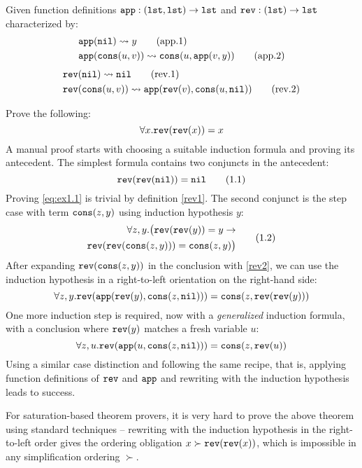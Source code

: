 \begin{example}\label{ex:1}
Given function definitions $\mathtt{app} : (\mathtt{lst},\mathtt{lst})\rightarrow\mathtt{lst}$ and $\mathtt{rev}:(\mathtt{lst})\rightarrow\mathtt{lst}$ characterized by:
\begin{align}
&\mathtt{app}(\mathtt{nil})\rightsquigarrow y\label{app1}\tag{app.1}\\ &\mathtt{app}(\mathtt{cons}(u,v))\rightsquigarrow\mathtt{cons}(u,\mathtt{app}(v,y))\label{app2}\tag{app.2}\end{align}
\dotfill
\begin{align}
&\mathtt{rev}(\mathtt{nil})\rightsquigarrow \mathtt{nil}\label{rev1}\tag{rev.1}\\ &\mathtt{rev}(\mathtt{cons}(u,v))\rightsquigarrow\mathtt{app}(\mathtt{rev}(v),\mathtt{cons}(u,\mathtt{nil}))\label{rev2}\tag{rev.2}\end{align}

Prove the following:
$$\forall x. \mathtt{rev}(\mathtt{rev}(x))=x$$
A manual proof starts with choosing a suitable induction formula and proving its antecedent. The simplest formula contains two conjuncts in the antecedent:
\begin{equation}\label{eq:ex1.1}\mathtt{rev}(\mathtt{rev}(\mathtt{nil})) = \mathtt{nil}\tag{1.1}\end{equation}
Proving \eqref{eq:ex1.1} is trivial by definition \eqref{rev1}. The second conjunct is the step case with term $\mathtt{cons}(z,y)$ using induction hypothesis $y$:
\begin{align}\begin{split}\forall z,y.\big(\mathtt{rev}(\mathtt{rev}(y))=y\rightarrow\\\mathtt{rev}(\mathtt{rev}(\mathtt{cons}(z,y)))=\mathtt{cons}(z,y)\big)\end{split}\label{eq:ex1.2}\tag{1.2}\end{align}
After expanding $\mathtt{rev}(\mathtt{cons}(z,y))$ in the conclusion with \eqref{rev2}, we can use the induction hypothesis in a right-to-left orientation on the right-hand side:
$$\forall z,y.\mathtt{rev}(\mathtt{app}(\mathtt{rev}(y),\mathtt{cons}(z,\mathtt{nil})))=\mathtt{cons}(z,\mathtt{rev}(\mathtt{rev}(y)))$$
One more induction step is required, now with a \textit{generalized} induction formula, with a conclusion where $\mathtt{rev}(y)$ matches a fresh variable $u$:
$$\forall z,u.\mathtt{rev}(\mathtt{app}(u,\mathtt{cons}(z,\mathtt{nil})))=\mathtt{cons}(z,\mathtt{rev}(u))$$
Using a similar case distinction and following the same recipe, that is, applying function definitions of $\mathtt{rev}$ and $\mathtt{app}$ and rewriting with the induction hypothesis leads to success.
\end{example}

For saturation-based theorem provers, it is very hard to prove the above theorem using standard techniques -- rewriting with the induction hypothesis in the right-to-left order gives the ordering obligation $x \succ \mathtt{rev}(\mathtt{rev}(x))$, which is impossible in any simplification ordering $\succ$.

